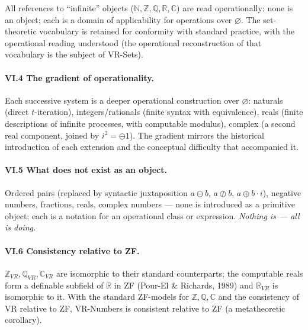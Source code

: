 \documentclass[11pt]{article}
\theoremstyle{definition}
\newcommand{\zero}{\varnothing}
\newcommand{\Z}{\mathbb{Z}}
\newcommand{\Q}{\mathbb{Q}}
\newcommand{\R}{\mathbb{R}}
\newcommand{\C}{\mathbb{C}}
\newcommand{\N}{\mathbb{N}}
\newcommand{\isub}{\ominus}              %
\newcommand{\fdiv}{\oslash}              %
\begin{document}
All references to ``infinite'' objects ($\N,\Z,\Q,\R,\C$) are read operationally: none is an object;
each is a domain of applicability for operations over $\zero$. The set-theoretic vocabulary is retained
for conformity with standard practice, with the operational reading understood (the operational
reconstruction of that vocabulary is the subject of VR-Sets).

\paragraph{VI.4 The gradient of operationality.} Each successive system is a deeper operational
construction over $\zero$: naturals (direct $t$-iteration), integers/rationals (finite syntax with
equivalence), reals (finite descriptions of infinite processes, with computable modulus), complex
(a second real component, joined by $i^2=\isub 1$). The gradient mirrors the historical introduction of
each extension and the conceptual difficulty that accompanied it.

\paragraph{VI.5 What does not exist as an object.} Ordered pairs (replaced by syntactic
juxtaposition $a\isub b,\,a\fdiv b,\,a\oplus b\cdot i$), negative numbers, fractions, reals, complex
numbers --- none is introduced as a primitive object; each is a notation for an operational class or
expression. \emph{Nothing is --- all is doing.}

\paragraph{VI.6 Consistency relative to ZF.} $\Z_{VR},\Q_{VR},\C_{VR}$ are isomorphic to their
standard counterparts; the computable reals form a definable subfield of $\R$ in ZF (Pour-El \&
Richards, 1989) and $\R_{VR}$ is isomorphic to it. With the standard ZF-models for $\Z,\Q,\C$ and
the consistency of VR relative to ZF, VR-Numbers is consistent relative to ZF (a metatheoretic
corollary).

\end{document}
